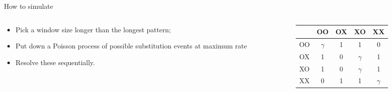 \documentclass[smaller]{beamer}
\begin{document}
\begin{frame}{How to simulate}
  \begin{columns}[c]
    \begin{column}{.5\textwidth}

  \begin{itemize}

    \item Pick a window size longer than the longest pattern; 

    \item Put down a Poisson process of {\newthing possible} substitution events at maximum rate

    \item Resolve these sequentially.

  \end{itemize}
    \end{column}
    \begin{column}{.5\textwidth}

      \begin{tabular}{c|cccc}
        & OO & OX & XO & XX \\
        \hline
        OO & {\color{red} $\gamma$} & 1 & 1 & 0 \\
        OX & 1 & {\color{red} 0} & $\gamma$ & 1 \\
        XO & 1 & 0 & {\color{red} $\gamma$} & 1 \\
        XX & 0 & 1 & 1 & {\color{red} $\gamma$} 
      \end{tabular}

    \end{column}
  \end{columns}


\end{frame}
\end{document}
